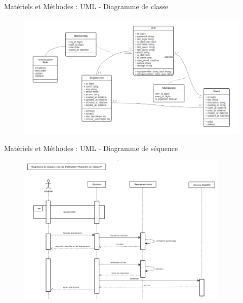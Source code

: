 \documentclass{beamer}
\begin{document}
\begin{frame}{Matériels et Méthodes : \small{UML} - \footnotesize{Diagramme de classe}}
  \begin{figure}[H]
    \centering
    \includegraphics[width=\textwidth]{../../images/class-diag.png}
\end{figure}
\end{frame}

\begin{frame}{Matériels et Méthodes : \small{UML} - \footnotesize{Diagramme de séquence}}
  \begin{figure}[H]
    \centering
    \includegraphics[width=0.9\textwidth]{../../images/join-meet-sequence-diag.png}
\end{figure}
\end{frame}
\end{document}
